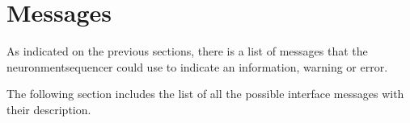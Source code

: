 \chapter{Messages}
\label{ch:messages}

As indicated on the previous sections, there is a list of messages that the \gls{neuronmentsequencer} could use to indicate an information, warning or error.

The following section includes the list of all the possible interface messages with their description.



\newpage